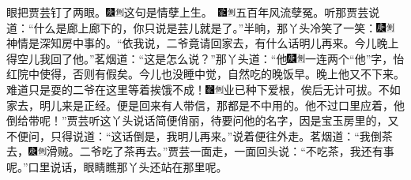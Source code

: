 眼把贾芸钉了两眼。{{\includegraphics[width=3mm]{../Images/00004}\includegraphics[width=3mm]{../Images/00011}\footnotesize \kaishu 这句是情孽上生。　}\includegraphics[width=3mm]{../Images/00006}\includegraphics[width=3mm]{../Images/00011}\footnotesize \kaishu 五百年风流孽冤。}听那贾芸说道：``什么是廊上廊下的，你只说是芸儿就是了。''半晌，那丫头冷笑了一笑：{\includegraphics[width=3mm]{../Images/00004}\includegraphics[width=3mm]{../Images/00011}\footnotesize \kaishu 神情是深知房中事的。}``依我说，二爷竟请回家去，有什么话明儿再来。今儿晚上得空儿我回了他。''茗烟道：``这是怎么说？''那丫头道：``他{\includegraphics[width=3mm]{../Images/00004}\includegraphics[width=3mm]{../Images/00011}\footnotesize \kaishu 一连两个``他''字，怡红院中使得，否则有假矣。}今儿也没睡中觉，自然吃的晚饭早。晚上他又不下来。难道只是耍的二爷在这里等着挨饿不成！{\includegraphics[width=3mm]{../Images/00006}\includegraphics[width=3mm]{../Images/00011}\footnotesize \kaishu 业已种下爱根，俟后无计可拔。}不如家去，明儿来是正经。便是回来有人带信，那都是不中用的。他不过口里应着，他倒给带呢！''贾芸听这丫头说话简便俏丽，待要问他的名字，因是宝玉房里的，又不便问，只得说道：``这话倒是，我明儿再来。''说着便往外走。茗烟道：``我倒茶去，{\includegraphics[width=3mm]{../Images/00004}\includegraphics[width=3mm]{../Images/00011}\footnotesize \kaishu 滑贼。}二爷吃了茶再去。''贾芸一面走，一面回头说：``不吃茶，我还有事呢。''口里说话，眼睛瞧那丫头还站在那里呢。

